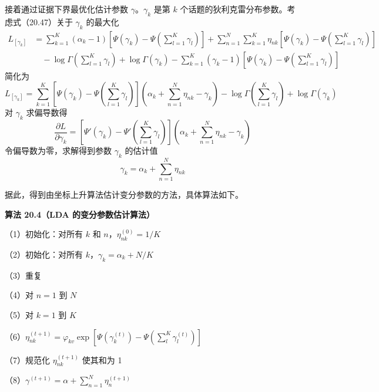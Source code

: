 \documentclass[UTF8,12pt,a4paper,fontset=fandol]{ctexart}
\begin{document}
接着通过证据下界最优化估计参数 $\gamma$。$\gamma_k$ 是第 $k$ 个话题的狄利克雷分布参数。考虑式（20.47）关于 $\gamma_k$ 的最大化
\begin{equation}
\begin{aligned}
L_{[\gamma_k]}
&=\sum_{k=1}^K(\alpha_k-1)\left[\Psi(\gamma_k)-\Psi\left(\sum_{l=1}^K\gamma_l\right)\right]
+\sum_{n=1}^N\sum_{k=1}^K \eta_{nk}\left[\Psi(\gamma_k)-\Psi\left(\sum_{l=1}^K\gamma_l\right)\right]\\
&\quad -\log\Gamma\left(\sum_{l=1}^K\gamma_l\right)+\log\Gamma(\gamma_k)
-\sum_{k=1}^K(\gamma_k-1)\left[\Psi(\gamma_k)-\Psi\left(\sum_{l=1}^K\gamma_l\right)\right]
\end{aligned}
\tag{20.59}
\end{equation}
简化为
\begin{equation}
L_{[\gamma_k]}=\sum_{k=1}^K\left[\Psi(\gamma_k)-\Psi\left(\sum_{l=1}^K\gamma_l\right)\right]\left(\alpha_k+\sum_{n=1}^N\eta_{nk}-\gamma_k\right)-\log\Gamma\left(\sum_{l=1}^K\gamma_l\right)+\log\Gamma(\gamma_k)
\tag{20.60}
\end{equation}
对 $\gamma_k$ 求偏导数得
\begin{equation}
\frac{\partial L}{\partial \gamma_k}=\left[\Psi'(\gamma_k)-\Psi'\left(\sum_{l=1}^K\gamma_l\right)\right]\left(\alpha_k+\sum_{n=1}^N\eta_{nk}-\gamma_k\right)
\tag{20.61}
\end{equation}
令偏导数为零，求解得到参数 $\gamma_k$ 的估计值
\begin{equation}
\gamma_k=\alpha_k+\sum_{n=1}^N\eta_{nk}
\tag{20.62}
\end{equation}

据此，得到由坐标上升算法估计变分参数的方法，具体算法如下。

\noindent\textbf{算法 20.4（LDA 的变分参数估计算法）}

（1）初始化：对所有 $k$ 和 $n$，$\eta_{nk}^{(0)}=1/K$

（2）初始化：对所有 $k$，$\gamma_k=\alpha_k+N/K$

（3）重复

（4）\quad 对 $n=1$ 到 $N$

（5）\quad\quad 对 $k=1$ 到 $K$

（6）\quad\quad $\eta_{nk}^{(t+1)}=\varphi_{kv}\exp\left[\Psi(\gamma_k^{(t)})-\Psi\left(\sum_l^K\gamma_l^{(t)}\right)\right]$

（7）\quad\quad 规范化 $\eta_{nk}^{(t+1)}$ 使其和为 1

（8）\quad $\gamma^{(t+1)}=\alpha+\sum_{n=1}^N \eta_n^{(t+1)}$
\end{document}
